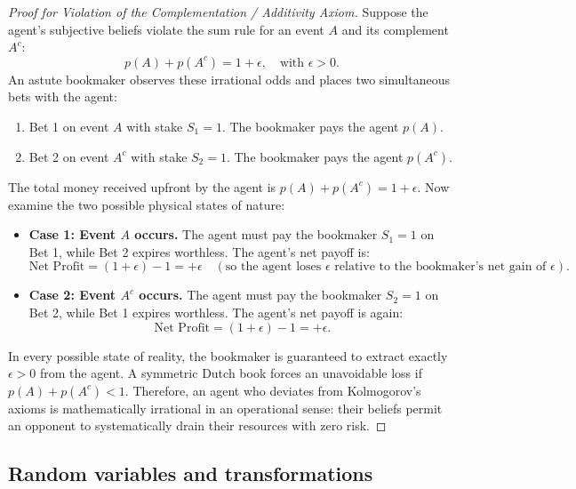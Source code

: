\begin{proof}[Proof for Violation of the Complementation / Additivity Axiom]
Suppose the agent's subjective beliefs violate the sum rule for an event $A$ and its complement $A^c$:
\begin{equation}
p(A) + p(A^c) = 1 + \epsilon, \quad \text{with } \epsilon > 0.
\end{equation}
An astute bookmaker observes these irrational odds and places two simultaneous bets with the agent:
\begin{enumerate}[noitemsep]
  \item Bet 1 on event $A$ with stake $S_1 = 1$. The bookmaker pays the agent $p(A)$.
  \item Bet 2 on event $A^c$ with stake $S_2 = 1$. The bookmaker pays the agent $p(A^c)$.
\end{enumerate}
The total money received upfront by the agent is $p(A) + p(A^c) = 1 + \epsilon$. Now examine the two possible physical states of nature:
\begin{itemize}[noitemsep]
  \item \textbf{Case 1: Event $A$ occurs.} The agent must pay the bookmaker $S_1 = 1$ on Bet 1, while Bet 2 expires worthless. The agent's net payoff is:
  \begin{equation}
  \text{Net Profit} = (1 + \epsilon) - 1 = +\epsilon \quad (\text{so the agent loses } \epsilon \text{ relative to the bookmaker's net gain of } \epsilon).
  \end{equation}
  \item \textbf{Case 2: Event $A^c$ occurs.} The agent must pay the bookmaker $S_2 = 1$ on Bet 2, while Bet 1 expires worthless. The agent's net payoff is again:
  \begin{equation}
  \text{Net Profit} = (1 + \epsilon) - 1 = +\epsilon.
  \end{equation}
\end{itemize}
In every possible state of reality, the bookmaker is guaranteed to extract exactly $\epsilon > 0$ from the agent. A symmetric Dutch book forces an unavoidable loss if $p(A) + p(A^c) < 1$. Therefore, an agent who deviates from Kolmogorov's axioms is mathematically irrational in an operational sense: their beliefs permit an opponent to systematically drain their resources with zero risk.
\end{proof}

\subsection{Random variables and transformations}
\label{sec:random_variables}

